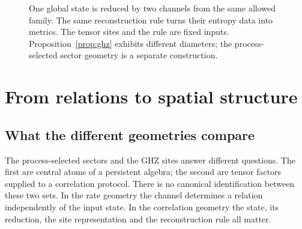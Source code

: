 \documentclass[12pt,a4paper]{article}
\begin{document}
\begin{figure}[ht]
\centering
{}
\caption{One global state is reduced by two channels from the same allowed family. The same reconstruction rule turns their entropy data into metrics. The tensor sites and the rule are fixed inputs. Proposition~\ref{prop:ghz} exhibits different diameters; the process-selected sector geometry is a separate construction.}
\label{fig:haff_scheme}
\end{figure}

\section{From relations to spatial structure}
\label{sec:discussion}
\label{sec:spatial-bridge}

\subsection{What the different geometries compare}

The process-selected sectors and the GHZ sites answer different
questions. The first are central atoms of a persistent algebra;
the second are tensor factors supplied to a correlation protocol.
There is no canonical identification between these two sets.
In the rate geometry the channel determines a relation independently
of the input state. In the correlation geometry the state, its
reduction, the site representation and the reconstruction rule all
matter.
\end{document}
